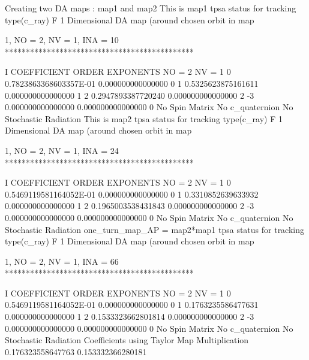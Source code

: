 \documentclass{hitec}     %
\begin{document}
{\begin{code}
 Creating two DA maps : map1 and map2
  This is map1
  tpsa status for tracking type(c_ray)  F
           1  Dimensional DA map (around chosen orbit in map%

          1, NO =    2, NV =    1, INA =   10
 *********************************************

    I  COEFFICIENT          ORDER   EXPONENTS
      NO =     2      NV =     1
   0  0.7823863368603357E-01   0.000000000000000       0
   1  0.5325623875161611       0.000000000000000       1
   2  0.2947893387720240       0.000000000000000       2
    -3   0.000000000000000       0.000000000000000       0
  No Spin Matrix
  No c_quaternion
 No Stochastic Radiation
  This is map2
  tpsa status for tracking type(c_ray)  F
           1  Dimensional DA map (around chosen orbit in map%

          1, NO =    2, NV =    1, INA =   24
 *********************************************

    I  COEFFICIENT          ORDER   EXPONENTS
      NO =     2      NV =     1
   0  0.5469119581164052E-01   0.000000000000000       0
   1  0.3310852639633932       0.000000000000000       1
   2  0.1965003538431843       0.000000000000000       2
    -3   0.000000000000000       0.000000000000000       0
  No Spin Matrix
  No c_quaternion
 No Stochastic Radiation
 one_turn_map_AP = map2*map1
  tpsa status for tracking type(c_ray)  F
           1  Dimensional DA map (around chosen orbit in map%

          1, NO =    2, NV =    1, INA =   66
 *********************************************

    I  COEFFICIENT          ORDER   EXPONENTS
      NO =     2      NV =     1
   0  0.5469119581164052E-01   0.000000000000000       0
   1  0.1763235586477631       0.000000000000000       1
   2  0.1533323662801814       0.000000000000000       2
    -3   0.000000000000000       0.000000000000000       0
  No Spin Matrix
  No c_quaternion
 No Stochastic Radiation
 Coefficients using Taylor Map Multiplication
  0.176323558647763       0.153332366280181
\end{code}

}
\end{document}
